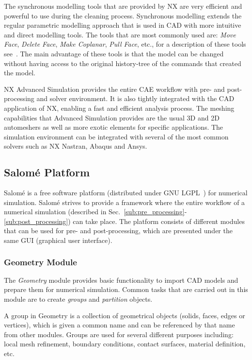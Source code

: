 The synchronous modelling tools that are provided by NX are very efficient and powerful to use during the cleaning process. Synchronous modelling extends the regular parametric modelling approach that is used in CAD with more intuitive and direct modelling tools. The tools that are most commonly used are: \textit{Move Face}, \textit{Delete Face}, \textit{Make Coplanar}, \textit{Pull Face}, etc., for a description of these tools see~\cite{goncharov14}. The main advantage of these tools is that the model can be changed without having access to the original history-tree of the commands that created the model.

NX Advanced Simulation provides the entire CAE workflow with pre- and post-processing and solver environment. It is also tightly integrated with the CAD application of NX, enabling a fast and efficient analysis process. The meshing capabilities that Advanced Simulation provides are the usual 3D and 2D automeshers as well as more exotic elements for specific applications. The simulation environment can be integrated with several of the most common solvers such as NX Nastran, Abaqus and Ansys.

\subsection{Salomé Platform} %
\label{sec:salom_platform}
Salomé is a free software platform (distributed under GNU LGPL~\cite{lgpl}) for numerical simulation. Salomé strives to provide a framework where the entire workflow of a numerical simulation (described in Sec.~\ref{sub:pre_processing}-\ref{sub:post_processing}) can take place. The platform consists of different modules that can be used for pre- and post-processing, which are presented under the same GUI (graphical user interface).~\cite{ribes07} 

\subsubsection{Geometry Module} %
\label{ssub:geometry_module}
The \textit{Geometry} module provides basic functionality to import CAD models and prepare them for numerical simulation. Common tasks that are carried out in this module are to create \textit{groups} and \textit{partition} objects.

A group in Geometry is a collection of geometrical objects (solids, faces, edges or vertices), which is given a common name and can be referenced by that name from other modules. Groups are used for several different purposes including: local mesh refinement, boundary conditions, contact surfaces, material definition, etc.

